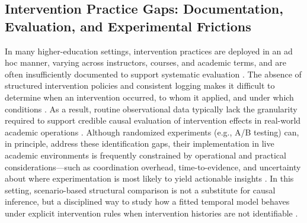 \subsection{Intervention Practice Gaps: Documentation, Evaluation, and Experimental Frictions}
In many higher-education settings, intervention practices are deployed in an ad hoc manner, varying across instructors, courses, and academic terms, and are often insufficiently documented to support systematic evaluation \cite{Connolly2018TrialsEvidenceBased,Harackiewicz2018TargetedIntervention,Kizilcec2020ScalingInterventions}. The absence of structured intervention policies and consistent logging makes it difficult to determine when an intervention occurred, to whom it applied, and under which conditions \cite{Sonderlund2018LAInterventions,Page2020ClusteredObservationalEducation,Kitto2023CausalModelsLA}. As a result, routine observational data typically lack the granularity required to support credible causal evaluation of intervention effects in real-world academic operations \cite{Gallagher2020ChallengeBased,Sidiropoulos2022AgencySustainability}. Although randomized experiments (e.g., A/B testing) can, in principle, address these identification gaps, their implementation in live academic environments is frequently constrained by operational and practical considerations---such as coordination overhead, time-to-evidence, and uncertainty about where experimentation is most likely to yield actionable insights \cite{Chan2019AIMedEd,Connolly2018TrialsEvidenceBased,HahsVaughn2024MultisiteTrialChallenges}. In this setting, scenario-based structural comparison is not a substitute for causal inference, but a disciplined way to study how a fitted temporal model behaves under explicit intervention rules when intervention histories are not identifiable \cite{Igelstrom2022CausalInferenceObs,DoutreligneVaroquaux2025PredictiveDecisionCausal}.